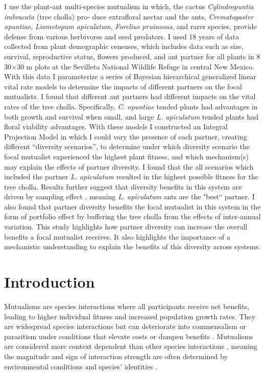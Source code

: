 \documentclass[11pt]{article}
\begin{document}
I use the plant-ant multi-species mutualism in which, the cactus \textit{Cylindropuntia imbracata} (tree cholla) pro- duce extrafloral nectar and the ants, \textit{Crematogaster opuntiae}, \textit{Liometopum apiculatum}, \textit{Forelius pruinosus}, and rarer species, provide defense from various herbivores and seed predators. 
I used 18 years of data collected from plant demographic censuses, which includes data such as size, survival, reproductive status, flowers produced, and ant partner for all plants in 8 30$\times$30 m plots at the Sevilleta National Wildlife Refuge in central New Mexico. 
With this data I parameterize a series of Bayesian hierarchical generalized linear vital rate models to determine the impacts of different partners on the focal mutualists. 
I found that different ant partners had different impacts on the vital rates of the tree cholla. 
Specifically, \textit{C. opuntiae} tended plants had advantages in both growth and survival when small, and large \textit{L. apiculatum} tended plants had floral viability advantages. 
With these models I constructed an Integral Projection Model in which I could vary the presence of each partner, creating different “diversity scenarios”, to determine under which diversity scenario the focal mutualist experienced the highest plant fitness, and which mechanism(s) may explain the effects of partner diversity. 
I found that the all scenarios which included the partner \textit{L. apiculatum} resulted in the highest possible fitness for the tree cholla. 
Results further suggest that diversity benefits in this system are driven by sampling effect , meaning \textit{L. apiculatum} ants are the "best`` partner.
I also found that partner diversity benefits the focal mutualist in this system in the form of portfolio effect by buffering the tree cholla from the effects of inter-annual variation. 
This study highlights how partner diversity can increase the overall benefits a focal mutualist receives. 
It also highlights the importance of a mechanistic understanding to explain the benefits of this diversity across systems.

\newpage{}
\section*{Introduction}
Mutualisms are species interactions where all participants receive net benefits, leading to higher individual fitness and increased population growth rates. 
They are widespread species interactions \citep{Bronstein1994,Chamberlain2014,Frederickson2013,Axelrod1981,Leigh2010} but can deteriorate into commensalism or parasitism under conditions that elevate costs or dampen benefits \citep{Rodriguez-Rodriguez2017,Song2020,Mandyam2014,Thrall2007, Bahia2022}.
Mutualisms are considered more context dependent than other species interactions \citep{Chamberlain2014,Frederickson2013}, meaning the magnitude and sign of interaction strength are often determined by environmental conditions and species' identities \citep{Noe1994,Leigh2010}.
\end{document}
